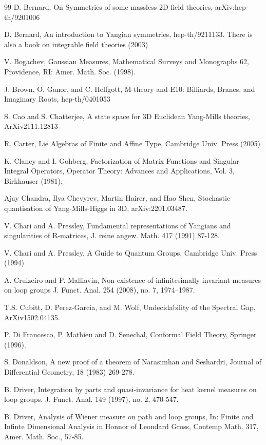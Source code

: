\documentclass{amsart}
\theoremstyle{conjecture}
\theoremstyle{definition}
\theoremstyle{question}
\theoremstyle{questions}
\theoremstyle{remark}
\theoremstyle{remarks}
\theoremstyle{example}
\numberwithin{equation}{section}
\begin{document}
\begin{thebibliography}{99}
D. Bernard, On Symmetries of some massless 2D field theories, arXiv:hep-th/9201006

 D. Bernard, An introduction to Yangian symmetries, hep-th/9211133. There
is also a book on integrable field theories (2003)


V. Bogachev, Gaussian Measures, Mathematical
Surveys and Monographs 62, Providence, RI: Amer. Math. Soc.
(1998).

 J. Brown, O. Ganor, and C. Helfgott, M-theory and E10: Billiards, Branes, and
Imaginary Roots, hep-th/0401053

S. Cao and S. Chatterjee, A state space for 3D Euclidean Yang-Mills theories, ArXiv2111.12813

 R. Carter, Lie Algebras of Finite and Affine Type, Cambridge Univ. Press (2005)

 K. Clancy and I. Gohberg, Factorization of Matrix Functions and Singular Integral Operators, 
Operator Theory: Advances and Applications, Vol. 3, Birkhauser (1981). 

  Ajay Chandra, Ilya Chevyrev, Martin Hairer, and Hao Shen, Stochastic quantisation of Yang-Mills-Higgs in 3D,
arXiv:2201.03487.

 V. Chari and A. Pressley, Fundamental representations of Yangians and
singularities of R-matrices, J. reine angew. Math. 417 (1991) 87-128.

 V. Chari and A. Pressley, A Guide to Quantum Groups, Cambridge Univ. Press (1994)

 A. Cruizeiro and P. Malliavin, Non-existence of infinitesimally invariant measures on loop groups
J. Funct. Anal. 254 (2008), no. 7, 1974–1987.

T.S. Cubitt, D. Perez-Garcia, and M. Wolf, Undecidability of the Spectral Gap, ArXiv1502.04135.

 P. Di Francesco, P. Mathieu and D. Senechal, Conformal Field Theory, Springer (1996).

S. Donaldson, A new proof of a theorem of Narasimhan and Seshardri, Journal of Differential Geometry, 18 (1983) 269-278.

 B. Driver,  Integration by parts and quasi-invariance
for heat kernel measures on loop groups. J. Funct. Anal. 149 (1997), no. 2, 470-547.

 B. Driver, Analysis of Wiener measure on path and loop groups,
In: Finite and Infinte Dimensional Analysis in Honnor of Leondard Gross,
Contemp Math. 317, Amer. Math. Soc., 57-85.


\end{thebibliography}
\end{document}
